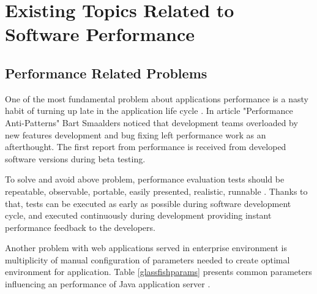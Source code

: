 \documentclass[12pt,a4paper]{article}
\begin{document}
\section{Existing Topics Related to Software Performance} \label{section:existiontopics}

\subsection{Performance Related Problems} \label{PerformanceRelatedProblems}
One of the most fundamental problem about applications performance is a nasty habit of turning up late in the application life cycle \cite{artperformance}. In article "Performance Anti-Patterns" \cite{lssrarticle} Bart Smaalders noticed that development teams overloaded by new features development and bug fixing left performance work as an afterthought. The first report from performance is received from developed software versions during beta testing.

To solve and avoid above problem, performance evaluation tests should be repeatable, observable, portable, easily presented, realistic, runnable  \cite{lssrarticle}. Thanks to that, tests can be executed as early as possible during software development cycle, and executed continuously during development providing instant performance feedback to the developers. 

Another problem with web applications served in enterprise environment is multiplicity of manual configuration of parameters needed to create optimal environment for application. Table \ref{glassfishparams} presents common parameters influencing an performance of Java application server \cite{glassfishdoc} \cite{deployerproblem}.  
\end{document}
